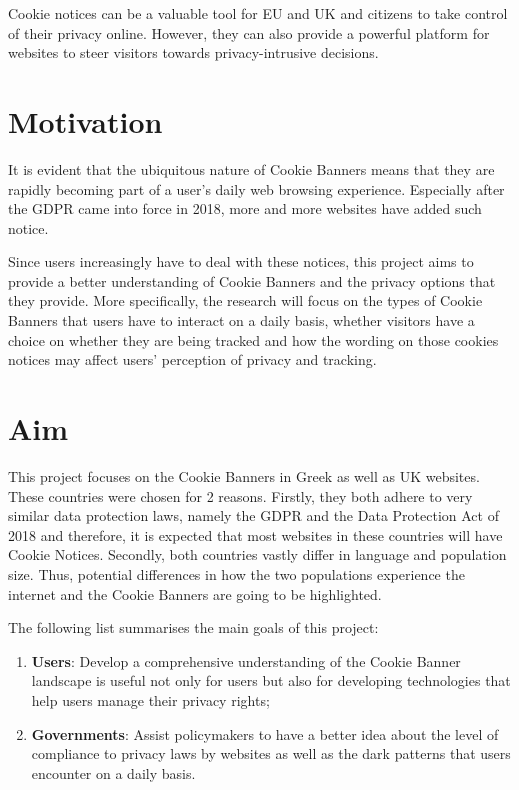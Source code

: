 \documentclass[../main.tex]{subfiles}
\begin{document}
Cookie notices can be a valuable tool for EU and UK and citizens to take control of their privacy online. However, they can also provide a powerful platform for websites to steer visitors towards privacy-intrusive decisions. 

\section{Motivation}
It is evident that the ubiquitous nature of Cookie Banners means that they are rapidly becoming part of a user’s daily web browsing experience. Especially after the GDPR came into force in 2018, more and more websites have added such notice. 

Since users increasingly have to deal with these notices, this project aims to provide a better understanding of Cookie Banners and the privacy options that they provide. More specifically, the research will focus on the types of Cookie Banners that users have to interact on a daily basis, whether visitors have a choice on whether they are being tracked and how the wording on those cookies notices may affect users’ perception of privacy and tracking.

\section{Aim}
This project focuses on the Cookie Banners in Greek as well as UK websites. These countries were chosen for 2 reasons. Firstly, they both adhere to very similar data protection laws, namely the GDPR and the Data Protection Act of 2018 and therefore, it is expected that most websites in these countries will have Cookie Notices. Secondly, both countries vastly differ in language and population size. Thus, potential differences in how the two populations experience the internet and the Cookie Banners are going to be highlighted.

The following list summarises the main goals of this project:

\begin{enumerate}
    \item \textbf{Users}: Develop a comprehensive understanding of the Cookie Banner landscape is useful not only for users but also for developing technologies that help users manage their privacy rights;
    \item \textbf{Governments}: Assist policymakers to have a better idea about the level of compliance to privacy laws by websites as well as the dark patterns that users encounter on a daily basis.
\end{enumerate}
\end{document}
